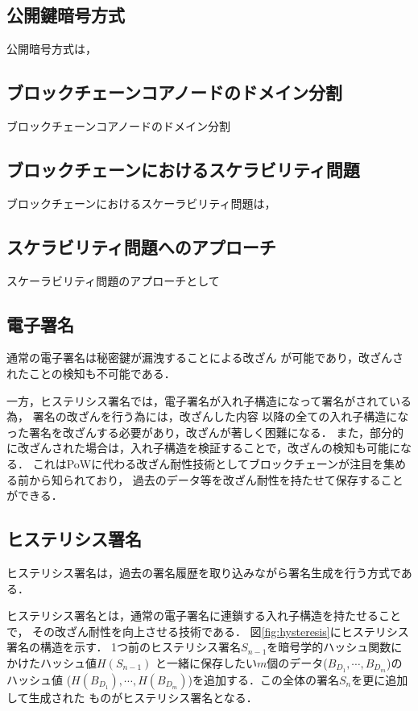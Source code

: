 \documentclass[a4paper,12pt]{jsarticle}
\begin{document}
      \subsection{公開鍵暗号方式}

公開暗号方式は，


      \subsection{ブロックチェーンコアノードのドメイン分割}
ブロックチェーンコアノードのドメイン分割

      \subsection{ブロックチェーンにおけるスケラビリティ問題}
ブロックチェーンにおけるスケーラビリティ問題は，

      \subsection{スケラビリティ問題へのアプローチ}
スケーラビリティ問題のアプローチとして

      \subsection{電子署名}
通常の電子署名は秘密鍵が漏洩することによる改ざん
が可能であり，改ざんされたことの検知も不可能である．

一方，ヒステリシス署名では，電子署名が入れ子構造になって署名がされている為，
署名の改ざんを行う為には，改ざんした内容
以降の全ての入れ子構造になった署名を改ざんする必要があり，改ざんが著しく困難になる．
また，部分的に改ざんされた場合は，入れ子構造を検証することで，改ざんの検知も可能になる．
これはPoWに代わる改ざん耐性技術としてブロックチェーンが注目を集める前から知られており，
過去のデータ等を改ざん耐性を持たせて保存することができる．

      \subsection{ヒステリシス署名}

ヒステリシス署名は，過去の署名履歴を取り込みながら署名生成を行う方式である．

ヒステリシス署名\cite{suzaki}とは，通常の電子署名に連鎖する入れ子構造を持たせることで，
その改ざん耐性を向上させる技術である．
図\ref{fig:hysteresis}にヒステリシス署名の構造を示す．
1つ前のヒステリシス署名$S_{n-1}$を暗号学的ハッシュ関数にかけたハッシュ値$H(S_{n-1})$
と一緒に保存したい$m$個のデータ($B_{D_1}, \cdots, B_{D_m}$)のハッシュ値
($H(B_{D_1}), \cdots, H(B_{D_m})$)を追加する．この全体の署名$S_n$を更に追加して生成された
ものがヒステリシス署名となる．
\end{document}
